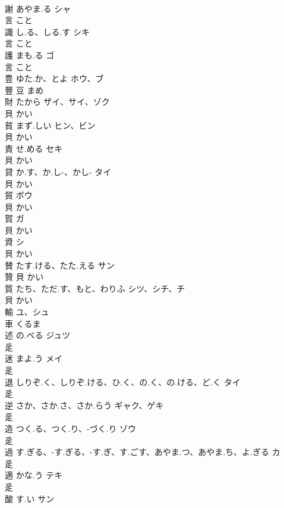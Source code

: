 \documentclass[8pt]{extreport}
\begin{document}
\begin{CJK}{UTF8}{min}
\\	謝	あやま.る	シャ	
\\	言		こと		
\\	識	し.る、しる.す	シキ	
\\	言		こと		
\\	護	まも.る	ゴ	
\\	言		こと		
\\	豊	ゆた.か、とよ	ホウ、ブ	
\\	豐	豆		まめ		
\\	財	たから	ザイ、サイ、ゾク	
\\	貝		かい		
\\	貧	まず.しい	ヒン、ビン	
\\	貝		かい		
\\	責	せ.める	セキ	
\\	貝		かい		
\\	貸	か.す、か.し-、かし-	タイ	
\\	貝		かい		
\\	貿		ボウ	
\\	貝		かい		
\\	賀		ガ	
\\	貝		かい		
\\	資		シ	
\\	貝		かい		
\\	賛	たす.ける、たた.える	サン	
\\	贊	貝		かい		
\\	質	たち、ただ.す、もと、わりふ	シツ、シチ、チ	
\\	貝		かい		
\\	輸		ユ、シュ	
\\	車		くるま		
\\	述	の.べる	ジュツ	
\\	辵				
\\	迷	まよ.う	メイ	
\\	辵				
\\	退	しりぞ.く、しりぞ.ける、ひ.く、の.く、の.ける、ど.く	タイ	
\\	辵				
\\	逆	さか、さか.さ、さか.らう	ギャク、ゲキ	
\\	辵				
\\	造	つく.る、つく.り、-づく.り	ゾウ	
\\	辵				
\\	過	す.ぎる、-す.ぎる、-す.ぎ、す.ごす、あやま.つ、あやま.ち、よ.ぎる	カ	
\\	辵				
\\	適	かな.う	テキ	
\\	辵				
\\	酸	す.い	サン	

\end{CJK}
\end{document}
